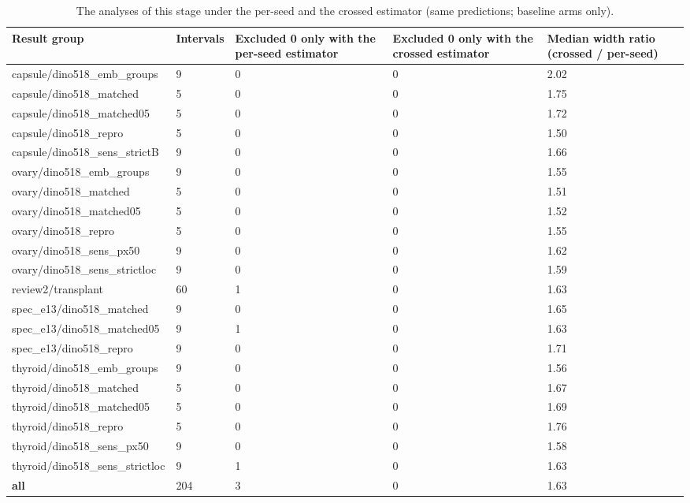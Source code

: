 \begin{table}[H]\centering\scriptsize
\caption{The analyses of this stage under the per-seed and the crossed estimator (same predictions; baseline arms only).}\label{tab:estcheck}
\begin{tabular}{p{5.0cm}p{1.4cm}p{2.6cm}p{2.6cm}p{2.4cm}}\toprule
Result group & Intervals & Excluded 0 only with the per-seed estimator & Excluded 0 only with the crossed estimator & Median width ratio (crossed / per-seed) \\\midrule
capsule/\allowbreak{}dino518\_emb\_groups & 9 & 0 & 0 & 2.02 \\
capsule/\allowbreak{}dino518\_matched & 5 & 0 & 0 & 1.75 \\
capsule/\allowbreak{}dino518\_matched05 & 5 & 0 & 0 & 1.72 \\
capsule/\allowbreak{}dino518\_repro & 5 & 0 & 0 & 1.50 \\
capsule/\allowbreak{}dino518\_sens\_strictB & 9 & 0 & 0 & 1.66 \\
ovary/\allowbreak{}dino518\_emb\_groups & 9 & 0 & 0 & 1.55 \\
ovary/\allowbreak{}dino518\_matched & 5 & 0 & 0 & 1.51 \\
ovary/\allowbreak{}dino518\_matched05 & 5 & 0 & 0 & 1.52 \\
ovary/\allowbreak{}dino518\_repro & 5 & 0 & 0 & 1.55 \\
ovary/\allowbreak{}dino518\_sens\_px50 & 9 & 0 & 0 & 1.62 \\
ovary/\allowbreak{}dino518\_sens\_strictloc & 9 & 0 & 0 & 1.59 \\
review2/\allowbreak{}transplant & 60 & 1 & 0 & 1.63 \\
spec\_e13/\allowbreak{}dino518\_matched & 9 & 0 & 0 & 1.65 \\
spec\_e13/\allowbreak{}dino518\_matched05 & 9 & 1 & 0 & 1.63 \\
spec\_e13/\allowbreak{}dino518\_repro & 9 & 0 & 0 & 1.71 \\
thyroid/\allowbreak{}dino518\_emb\_groups & 9 & 0 & 0 & 1.56 \\
thyroid/\allowbreak{}dino518\_matched & 5 & 0 & 0 & 1.67 \\
thyroid/\allowbreak{}dino518\_matched05 & 5 & 0 & 0 & 1.69 \\
thyroid/\allowbreak{}dino518\_repro & 5 & 0 & 0 & 1.76 \\
thyroid/\allowbreak{}dino518\_sens\_px50 & 9 & 0 & 0 & 1.58 \\
thyroid/\allowbreak{}dino518\_sens\_strictloc & 9 & 1 & 0 & 1.63 \\
\textbf{all} & 204 & 3 & 0 & 1.63 \\
\bottomrule\end{tabular}
\end{table}
